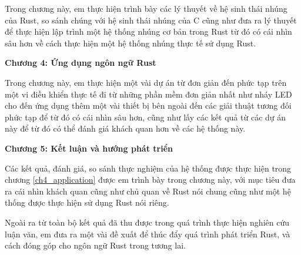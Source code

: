 Trong chương này, em thực hiện trình bày các lý thuyết về hệ sinh thái nhúng của Rust, so sánh chúng với hệ sinh thái nhúng của C cũng như đưa ra lý thuyết để thực hiện lập trình một hệ thống nhúng cơ bản trong Rust từ đó có cái nhìn sâu hơn về cách thực hiện một hệ thống nhúng thực tế sử dụng Rust.

\textbf{Chương 4: Ứng dụng ngôn ngữ Rust}

Trong chương này, em thực hiện một vài dự án từ đơn giản đến phức tạp trên một vi điều khiển thực tế đi từ những phần mềm đơn giản nhất như nháy LED cho đến ứng dụng thêm một vài thiết bị bên ngoài đến các giải thuật tương đối phức tạp để từ đó có cái nhìn sâu hơn, cũng như lấy các kết quả từ các dự án này để từ đó có thể đánh giá khách quan hơn về các hệ thống này.

\textbf{Chương 5: Kết luận và hướng phát triển}

Các kết quả, đánh giá, so sánh thực nghiệm của hệ thống được thực hiện trong chương \ref{ch4_application} được em trình bày trong chương này, với mục tiêu đưa ra cái nhìn khách quan cũng như chủ quan về Rust nói chung cũng như một hệ thống được thực hiện sử dụng Rust nói riêng.

Ngoài ra từ toàn bộ kết quả đã thu được trong quá trình thực hiện nghiên cứu luận văn, em đưa ra một vài đề xuất để thúc đẩy quá trình phát triển Rust, và cách đóng góp cho ngôn ngữ Rust trong tương lai.

